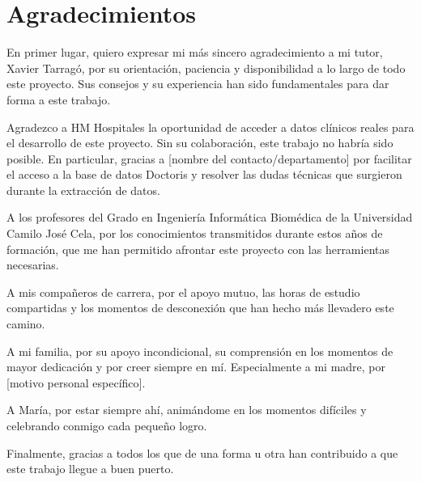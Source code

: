 \documentclass[12pt, a4paper, oneside]{report}
\begin{document}
\chapter*{Agradecimientos}

En primer lugar, quiero expresar mi más sincero agradecimiento a mi tutor, Xavier Tarragó, por su orientación, paciencia y disponibilidad a lo largo de todo este proyecto. Sus consejos y su experiencia han sido fundamentales para dar forma a este trabajo.

Agradezco a HM Hospitales la oportunidad de acceder a datos clínicos reales para el desarrollo de este proyecto. Sin su colaboración, este trabajo no habría sido posible. En particular, gracias a [nombre del contacto/departamento] por facilitar el acceso a la base de datos Doctoris y resolver las dudas técnicas que surgieron durante la extracción de datos.

A los profesores del Grado en Ingeniería Informática Biomédica de la Universidad Camilo José Cela, por los conocimientos transmitidos durante estos años de formación, que me han permitido afrontar este proyecto con las herramientas necesarias.

A mis compañeros de carrera, por el apoyo mutuo, las horas de estudio compartidas y los momentos de desconexión que han hecho más llevadero este camino.

A mi familia, por su apoyo incondicional, su comprensión en los momentos de mayor dedicación y por creer siempre en mí. Especialmente a mi madre, por [motivo personal específico].

A María, por estar siempre ahí, animándome en los momentos difíciles y celebrando conmigo cada pequeño logro.

Finalmente, gracias a todos los que de una forma u otra han contribuido a que este trabajo llegue a buen puerto.
\clearpage

\tableofcontents
\clearpage

\newpage
\listoffigures
{}

\newpage
\listoftables
{}


\newpage
{}
\end{document}
